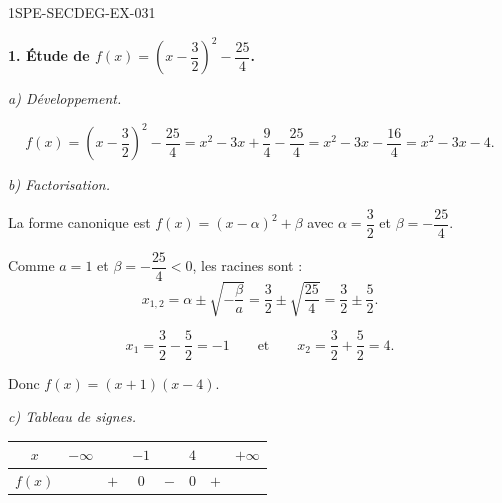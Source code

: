 \begin{corrige}{1SPE-SECDEG-EX-031}

\textbf{1. Étude de $f(x) = \left(x - \dfrac{3}{2}\right)^2 - \dfrac{25}{4}$.}

\textit{a) Développement.}


\[f(x) = \left(x - \frac{3}{2}\right)^2 - \frac{25}{4} = x^2 - 3x + \frac{9}{4} - \frac{25}{4} = x^2 - 3x - \frac{16}{4} = x^2 - 3x - 4.\]

\textit{b) Factorisation.}


La forme canonique est $f(x) = (x - \alpha)^2 + \beta$ avec $\alpha = \dfrac{3}{2}$ et $\beta = -\dfrac{25}{4}$.

Comme $a = 1$ et $\beta = -\dfrac{25}{4} < 0$, les racines sont :
\[x_{1,2} = \alpha \pm \sqrt{-\frac{\beta}{a}} = \frac{3}{2} \pm \sqrt{\frac{25}{4}} = \frac{3}{2} \pm \frac{5}{2}.\]

\[x_1 = \frac{3}{2} - \frac{5}{2} = -1 \qquad \text{et} \qquad x_2 = \frac{3}{2} + \frac{5}{2} = 4.\]

Donc $f(x) = (x + 1)(x - 4)$.

\textit{c) Tableau de signes.}


\medskip
\begin{center}
\begin{tabular}{|c|ccccccc|}
\hline
$x$ & $-\infty$ & & $-1$ & & $4$ & & $+\infty$ \\
\hline
$f(x)$ & & $+$ & $0$ & $-$ & $0$ & $+$ & \\
\hline
\end{tabular}
\end{center}


\end{corrige}
